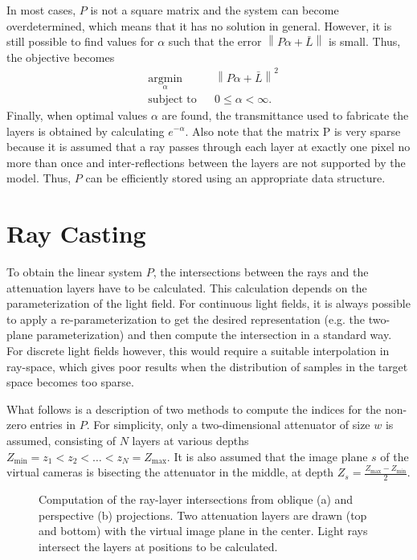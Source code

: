 In most cases, $P$ is not a square matrix and the system can become overdetermined, which means that it has no solution in general.
However, it is still possible to find values for $\alpha$ such that the error $\left\lVert P \alpha + \bar{L} \right\rVert$ is small. 
Thus, the objective becomes
\begin{equation} \label{eq:minimize_norm}
	\begin{aligned}
		& \underset{\alpha}{\text{argmin}} 	& & \left\lVert P \alpha + \bar{L} \right\rVert ^2 \\
		& \text{subject to} 				& & 0 \leq \alpha < \infty.
	\end{aligned}
\end{equation}
Finally, when optimal values $\alpha$ are found, the transmittance used to fabricate the layers is obtained by calculating $e^{-\alpha}$.
Also note that the matrix P is very sparse because it is assumed that a ray passes through each layer at exactly one pixel no more than once and inter-reflections between the layers are not supported by the model.
Thus, $P$ can be efficiently stored using an appropriate data structure.

\section{Ray Casting}
\label{sec:ray_casting}

To obtain the linear system $P$, the intersections between the rays and the attenuation layers have to be calculated.
This calculation depends on the parameterization of the light field.
For continuous light fields, it is always possible to apply a re-parameterization to get the desired representation (e.g. the two-plane parameterization) and then compute the intersection in a standard way.
For discrete light fields however, this would require a suitable interpolation in ray-space, which gives poor results when the distribution of samples in the target space becomes too sparse.

What follows is a description of two methods to compute the indices for the non-zero entries in $P$. 
For simplicity, only a two-dimensional attenuator of size $w$ is assumed, consisting of $N$ layers at various depths 
$Z_{\text{min}} = z_1 < z_2 < \dots < z_N = Z_{\text{max}}$.
It is also assumed that the image plane $s$ of the virtual cameras is bisecting the attenuator in the middle, at depth 
$Z_s = \frac{Z_{\text{max}} - Z_{\text{min}}}{2}$.

\begin{figure}[htb]
	\subcaptionbox{\label{fig:ray_casting_oblique_projection}}{}\hfill%
	\subcaptionbox{\label{fig:ray_casting_perspective_projection}}{}
	\caption[Computation of the ray-layer intersections from oblique and perspective projections]
			{Computation of the ray-layer intersections from oblique (a) and perspective (b) projections.
			 Two attenuation layers are drawn (top and bottom) with the virtual image plane in the center.
			 Light rays intersect the layers at positions to be calculated.}
\end{figure}

